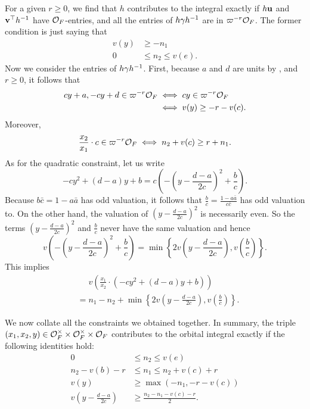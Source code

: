 For a given $r \ge 0$, we find that $h$ contributes to the integral exactly
if $h\mathbf u$ and $\mathbf v^\top h^{-1}$ have $\mathcal O_F$-entries,
and all the entries of $h \gamma h^{-1}$ are in $\varpi^{-r}\mathcal O_F$.
The former condition is just saying that
\begin{align*}
  v(y) &\ge -n_1 \\
  0 &\le n_2 \le v(e).
\end{align*}
Now we consider the entries of $h\gamma h^{-1}$.
First, because $a$ and $d$ are units by ,
and $r \ge 0$, it follows that
\begin{align*}
  cy + a, -cy + d \in \varpi^{-r}\mathcal O_F
  &\iff cy \in \varpi^{-r}\mathcal O_F \\
  &\iff v(y) \ge -r - v(c).
\end{align*}
Moreover,
\[ \frac{x_2}{x_1} \cdot c \in \varpi^{-r} \mathcal O_F
  \iff n_2 + v(c) \ge r + n_1. \]
As for the quadratic constraint, let us write
\[
  -cy^2 + (d-a)y + b
  = c\left( -\left( y - \frac{d-a}{2c} \right)^2 + \frac bc \right).
\]
Because $b \bar c = 1 - a \bar a$ has odd valuation,
it follows that $\frac b c = \frac{1-a \bar a}{c\bar c}$ has odd valuation to.
On the other hand, the valuation of
$\left( y - \frac{d-a}{2c} \right)^2$ is necessarily even.
So the terms $\left( y - \frac{d-a}{2c} \right)^2$ and $\frac bc$
never have the same valuation and hence
\[ v\left( -\left( y - \frac{d-a}{2c} \right)^2 + \frac bc  \right)
  = \min \left\{ 2v\left( y - \frac{d-a}{2c} \right), v\left( \frac bc \right) \right\}. \]
This implies
\begin{align*}
  &\phantom= v\left( \frac{x_1}{x_2} \cdot \left( -cy^2+(d-a)y+b \right) \right) \\
  &= n_1 - n_2 + \min \left\{ 2v\left( y - \frac{d-a}{2c} \right), v\left( \frac bc \right) \right\}.
\end{align*}

We now collate all the constraints we obtained together.
In summary, the triple $(x_1, x_2, y) \in \mathcal O_F^\times \times \mathcal O_F^\times \times \mathcal O_F$
contributes to the orbital integral exactly if the following identities hold:
\begin{align*}
  0 &\le n_2 \le v(e) \\
  n_2  - v(b) - r &\le n_1 \le n_2 + v(c) + r \\
  v(y) &\ge \max\left(-n_1, -r-v(c)\right) \\
  v\left( y - \frac{d-a}{2c} \right) &\ge \frac{n_2 - n_1 - v(c) - r}{2}.
\end{align*}
